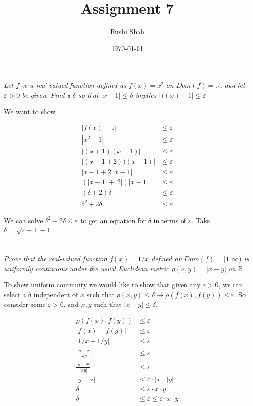 \documentclass[]{article}
\author{Rushi Shah}
\date{\today}
\title{Assignment 7}
\newcommand{\reals}{\mathbb{R}}
\begin{document}
	\maketitle

	\section{}
		\textit{Let $f$ be a real-valued function defined as $f(x) = x^2$ on $Dom(f) = \reals$, and let $\varepsilon > 0$ be given. Find a $\delta$ so that $|x - 1| \leq \delta$ implies $|f(x) - 1| \leq \varepsilon$.}

		We want to show

		\begin{align*}
			|f(x) - 1| &\leq \varepsilon \\
			|x^2 - 1| &\leq \varepsilon \\
			|(x + 1)(x - 1)| &\leq \varepsilon \\ 
			|(x - 1 + 2))(x - 1)| &\leq \varepsilon \\
			|x - 1 + 2||x - 1| &\leq \varepsilon \\
			(|x - 1| + |2|)|x - 1| &\leq \varepsilon \\
			(\delta + 2)\delta &\leq \varepsilon \\
			\delta^2 + 2 \delta &\leq \varepsilon
		\end{align*}

		We can solve $\delta^2 + 2 \delta \leq \varepsilon$ to get an equation for $\delta$ in terms of $\varepsilon$. Take $\delta = \sqrt{\varepsilon + 1} - 1$.

	\section{}
		\textit{Prove that the real-valued function $f(x) = 1/x$ defined on $Dom(f) = [1, \infty)$ is uniformly continuous under the usual Euclidean metric $\rho(x, y) = |x - y|$ on $\reals$.}

		To show uniform continuity we would like to show that given any $\varepsilon > 0$, we can select a $\delta$ independent of $x$ such that $\rho(x, y) \leq \delta \to \rho(f(x), f(y)) \leq \varepsilon$. So consider some $\varepsilon > 0$, and $x, y$ such that $|x - y| \leq \delta$. 

		\begin{align*}
			\rho(f(x), f(y)) &\leq \varepsilon \\
			|f(x) - f(y)| &\leq \varepsilon	\\
			|1/x - 1/y| &\leq \varepsilon \\
			|\frac{y - x}{xy}| &\leq \varepsilon \\
			\frac{|y - x|}{|xy|} &\leq \varepsilon \\
			|y - x| &\leq \varepsilon \cdot |x| \cdot |y| \\
			\delta &\leq \varepsilon \cdot x \cdot y \\
			\delta &\leq \varepsilon \leq \varepsilon \cdot x \cdot y
		\end{align*}
\end{document}
